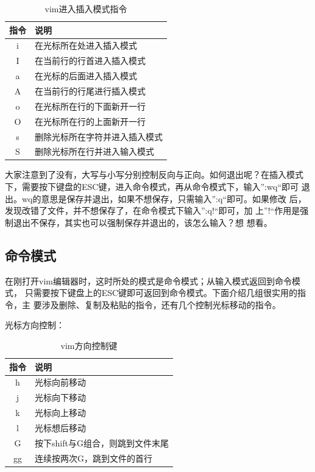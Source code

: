 \begin{table}[htbp]
  \centering
    \caption{vim进入插入模式指令}
    \label{tab:vimInsertMode}
    \begin{tabular}{cl}
      \toprule
      指令  & 说明 \\
      \midrule
      i     & 在光标所在处进入插入模式 \\
      I     & 在当前行的行首进入插入模式 \\
      a     & 在光标的后面进入插入模式 \\
      A     & 在当前行的行尾进行插入模式 \\
      o     & 在光标所在行的下面新开一行 \\
      O     & 在光标所在行的上面新开一行 \\
      s     & 删除光标所在字符并进入插入模式 \\
      S     & 删除光标所在行并进入输入模式 \\
      \bottomrule
    \end{tabular}
\end{table}

大家注意到了没有，大写与小写分别控制反向与正向。如何退出呢？在插入模式
下，需要按下键盘的ESC键，进入命令模式，再从命令模式下，输入”:wq“即可
退出。wq的意思是保存并退出，如果不想保存，只需输入”:q“即可。如果修改
后，发现改错了文件，并不想保存了，在命令模式下输入”:q!“即可，加
上”!“作用是强制退出不保存，其实也可以强制保存并退出的，该怎么输入？想
想看。

\subsection{命令模式}

在刚打开vim编辑器时，这时所处的模式是命令模式；从输入模式返回到命令模式，
只需要按下键盘上的ESC键即可返回到命令模式。下面介绍几组很实用的指令，主
要涉及删除、复制及粘贴的指令，还有几个控制光标移动的指令。

光标方向控制：

\begin{table}[htbp]
  \centering
    \caption{vim方向控制键}
    \label{tab:vimDirection}
    \begin{tabular}{cl}
      \toprule
      指令  & 说明 \\
      \midrule
      h  & 光标向前移动 \\
      j  & 光标向下移动 \\
      k  & 光标向上移动 \\
      l  & 光标想后移动 \\
      G  & 按下shift与G组合，则跳到文件末尾 \\
      gg & 连续按两次G，跳到文件的首行 \\
      \bottomrule
    \end{tabular}
\end{table}

